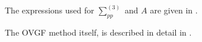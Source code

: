 The expressions used for $\sum_{pp}^{(3)}$ and $A$ are given in \cite{gf2}.

The OVGF method itself, is described in detail in \cite{gf1}.

%
%
%
